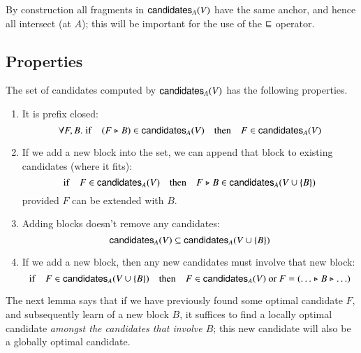 By construction all fragments in $\mathsf{candidates}_A(V)$ have the same anchor, and
hence all intersect (at $A$); this will be important for the use of the
$\mathrel{\sqsubseteq}$ operator.

\subsection{Properties}

\begin{lemma}
\label{candidates:properties}
The set of candidates computed by $\mathsf{candidates}_A(V)$ has the following
properties.

\begin{enumerate}

\item \label{candidates:prefixclosed}
It is prefix closed:
\begin{equation*}
\forall F, B .\;
\mathrm{if} \quad (F \mathrel{\triangleright} B) \in \mathsf{candidates}_A(V) \quad \mathrm{then} \quad F \in \mathsf{candidates}_A(V)
\end{equation*}

\item \label{candidates:appendnew}
If we add a new block into the set, we can append that block to existing
candidates (where it fits):
\begin{equation*}
\mathrm{if} \quad F \in \mathsf{candidates}_A(V) \quad \mathrm{then} \quad F \mathrel{\triangleright} B \in \mathsf{candidates}_A(V \cup \{ B \})
\end{equation*}
provided $F$ can be extended with $B$.

\item \label{candidates:monotone}
Adding blocks doesn't remove any candidates:
\begin{equation*}
\mathsf{candidates}_A(V) \subseteq \mathsf{candidates}_A(V \cup \{B\})
\end{equation*}

\item \label{candidates:musthavenew}
If we add a new block, then any new candidates must involve that new block:
\begin{equation*}
\mathrm{if} \quad F \in \mathsf{candidates}_A(V \cup \{B\}) \quad \mathrm{then} \quad F \in \mathsf{candidates}_A(V) \text{ or } F = (\ldots \mathrel{\triangleright} B \mathrel{\triangleright} \ldots)
\end{equation*}

\end{enumerate}
\end{lemma}

The next lemma says that if we have previously found some optimal candidate $F$,
and subsequently learn of a new block $B$, it suffices to find a locally optimal
candidate \emph{amongst the candidates that involve $B$}; this new candidate
will also be a globally optimal candidate.


